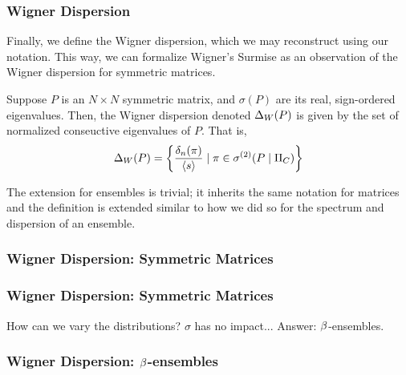 
\begin{frame} \frametitle{Wigner Dispersion}

Finally, we define the Wigner dispersion, which we may reconstruct using our notation. This way, we can formalize Wigner's Surmise as
an observation of the Wigner dispersion for symmetric matrices.

\begin{alertblock}{}
Suppose $P$ is an $N \times N$ symmetric matrix, and $\sigma(P)$ are its real, sign-ordered eigenvalues.
Then, the Wigner dispersion denoted $\Delta_{W}(P)$ is given by the set of normalized conseuctive eigenvalues of $P$. That is,
$$ \Delta_{W}(P) = \left\{ \frac{\delta_n(\pi)}{{\langle s \rangle}} \mid \pi \in {\sigma^{(2)}}(P \mid \Pi_C) \right\} $$
\end{alertblock}

The extension for ensembles is trivial; it inherits the same notation for matrices and the definition is extended similar to how we
did so for the spectrum and dispersion of an ensemble.

\end{frame}


\begin{frame} \frametitle{Wigner Dispersion: Symmetric Matrices}


\end{frame}


\begin{frame} \frametitle{Wigner Dispersion: Symmetric Matrices}

How can we vary the distributions? $\sigma$ has no impact...
Answer: $\beta$-ensembles.

\end{frame}


\begin{frame} \frametitle{Wigner Dispersion: $\beta$-ensembles}


\end{frame}

